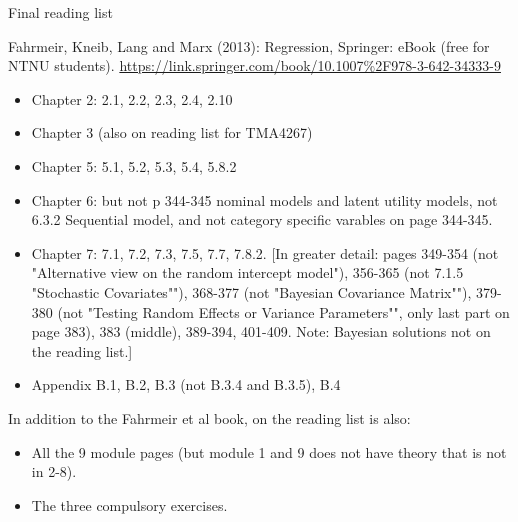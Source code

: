 \documentclass[ignorenonframetext,]{beamer}
\providecommand{\tightlist}{%
  \setlength{\itemsep}{0pt}\setlength{\parskip}{0pt}}
\begin{document}
\begin{frame}

\begin{block}{Final reading list}

Fahrmeir, Kneib, Lang and Marx (2013): Regression, Springer: eBook (free
for NTNU students).
\url{https://link.springer.com/book/10.1007\%2F978-3-642-34333-9}

\begin{itemize}
\tightlist
\item
  Chapter 2: 2.1, 2.2, 2.3, 2.4, 2.10
\item
  Chapter 3 (also on reading list for TMA4267)
\item
  Chapter 5: 5.1, 5.2, 5.3, 5.4, 5.8.2
\item
  Chapter 6: but not p 344-345 nominal models and latent utility models,
  not 6.3.2 Sequential model, and not category specific varables on page
  344-345.
\item
  Chapter 7: 7.1, 7.2, 7.3, 7.5, 7.7, 7.8.2.
  \footnotesize [In greater detail: pages 349-354 (not "Alternative view on the random intercept model"), 356-365 (not 7.1.5 "Stochastic Covariates""), 368-377 (not "Bayesian Covariance Matrix""), 379-380 (not "Testing Random Effects or Variance Parameters"", only last part on page 383), 383 (middle), 389-394, 401-409. Note: Bayesian solutions not on the reading list.] \normalsize
\item
  Appendix B.1, B.2, B.3 (not B.3.4 and B.3.5), B.4
\end{itemize}

\end{block}

\end{frame}

\begin{frame}

In addition to the Fahrmeir et al book, on the reading list is also:

\begin{itemize}
\tightlist
\item
  All the 9 module pages (but module 1 and 9 does not have theory that
  is not in 2-8).
\item
  The three compulsory exercises.
\end{itemize}

\end{frame}
\end{document}
